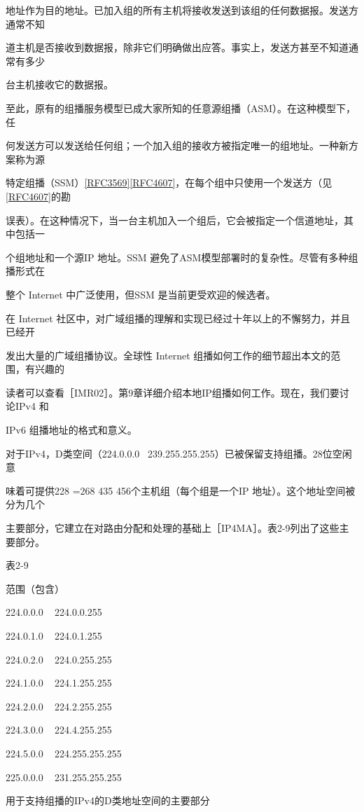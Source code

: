 地址作为目的地址。已加入组的所有主机将接收发送到该组的任何数据报。发送方通常不知

道主机是否接收到数据报，除非它们明确做出应答。事实上，发送方甚至不知道通常有多少

台主机接收它的数据报。

至此，原有的组播服务模型已成大家所知的任意源组播（ASM）。在这种模型下，任

何发送方可以发送给任何组；一个加入组的接收方被指定唯一的组地址。一种新方案称为源

特定组播（SSM）\href{https://www.rfc-editor.org/rfc/rfc3569}{[RFC3569]}\href{https://www.rfc-editor.org/rfc/rfc4607}{[RFC4607]}，在每个组中只使用一个发送方（见\href{https://www.rfc-editor.org/rfc/rfc4607}{[RFC4607]}的勘

误表）。在这种情况下，当一台主机加入一个组后，它会被指定一个信道地址，其中包括一

个组地址和一个源IP 地址。SSM 避免了ASM模型部署时的复杂性。尽管有多种组播形式在

整个 Internet 中广泛使用，但SSM 是当前更受欢迎的候选者。

在 Internet 社区中，对广域组播的理解和实现已经过十年以上的不懈努力，并且已经开

发出大量的广域组播协议。全球性 Internet 组播如何工作的细节超出本文的范围，有兴趣的

读者可以查看［IMR02］。第9章详细介绍本地IP组播如何工作。现在，我们要讨论IPv4 和

IPv6 组播地址的格式和意义。

对于IPv4，D类空间（224.0.0.0 ~239.255.255.255）已被保留支持组播。28位空闲意

味着可提供228 =268 435 456个主机组（每个组是一个IP 地址）。这个地址空间被分为几个

主要部分，它建立在对路由分配和处理的基础上［IP4MA］。表2-9列出了这些主要部分。

表2-9

范围（包含）

224.0.0.0 ~ 224.0.0.255

224.0.1.0 ~ 224.0.1.255

224.0.2.0 ~ 224.0.255.255

224.1.0.0 ~ 224.1.255.255

224.2.0.0 ~ 224.2.255.255

224.3.0.0 ~ 224.4.255.255

224.5.0.0 ~ 224.255.255.255

225.0.0.0 ~ 231.255.255.255

用于支持组播的IPv4的D类地址空间的主要部分

